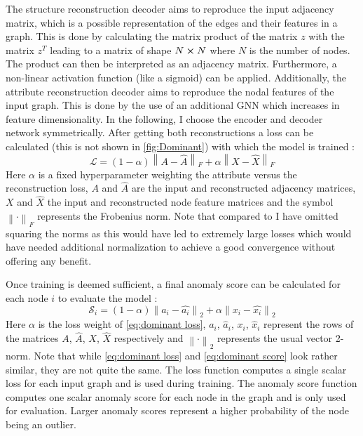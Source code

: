 \documentclass[11pt,a4paper]{article}
\begin{document}
The structure reconstruction decoder aims to reproduce the input adjacency matrix, which is a possible representation of the edges and their features in a graph. 
This is done by calculating the matrix product of the matrix $z$ with the matrix $z^T$ leading to a matrix of shape $N\cross N$ where $N$ is the number of nodes. 
The product can then be interpreted as an adjacency matrix. 
Furthermore, a non-linear activation function (like a sigmoid) can be applied. 
Additionally, the attribute reconstruction decoder aims to reproduce the nodal features of the input graph. 
This is done by the use of an additional GNN which increases in feature dimensionality. 
In the following, I choose the encoder and decoder network symmetrically. 
After getting both reconstructions a loss can be calculated (this is not shown in \autoref{fig:Dominant}) with which the model is trained \cite{dingDeepAnomalyDetection2019}:
\begin{equation}
\label{eq:dominant loss}
\mathcal{L} = (1-\alpha) \left\lVert A-\hat{A} \right\rVert _F + \alpha \left\lVert X-\hat{X} \right\rVert _F
\end{equation}
Here $\alpha$ is a fixed hyperparameter weighting the attribute versus the reconstruction loss, $A$ and $\hat{A}$ are the input and reconstructed adjacency matrices, $X$ and $\hat{X}$ the input and reconstructed node feature matrices and the symbol $\left\lVert\cdot \right\rVert _F$ represents the Frobenius norm. 
Note that compared to \cite{dingDeepAnomalyDetection2019} I have omitted squaring the norms as this would have led to extremely large losses which would have needed additional normalization to achieve a good convergence without offering any benefit. 

Once training is deemed sufficient, a final anomaly score can be calculated for each node $i$ to evaluate the model \cite{dingDeepAnomalyDetection2019}:
\begin{equation}
\label{eq:dominant score}
\mathcal{S}_i = (1-\alpha) \left\lVert a_i-\hat{a_i} \right\rVert _2 + \alpha \left\lVert x_i-\hat{x_i} \right\rVert _2
\end{equation}
Here $\alpha$ is the loss weight of \autoref{eq:dominant loss}, $a_i$, $\hat{a}_i$, $x_i$, $\hat{x}_i$ represent the rows of the matrices $A$, $\hat{A}$, $X$, $\hat{X}$ respectively and $\left\lVert\cdot \right\rVert _2$ represents the usual vector 2-norm. 
Note that while \autoref{eq:dominant loss} and \autoref{eq:dominant score} look rather similar, they are not quite the same. 
The loss function computes a single scalar loss for each input graph and is used during training. 
The anomaly score function computes one scalar anomaly score for each node in the graph and is only used for evaluation. 
Larger anomaly scores represent a higher probability of the node being an outlier. \\
\end{document}
